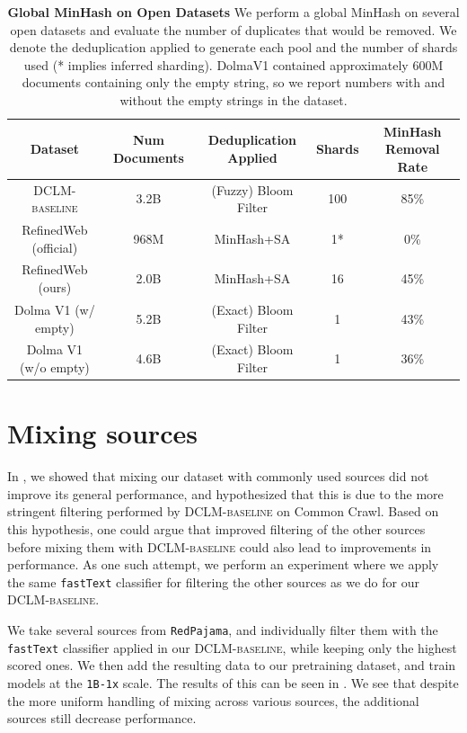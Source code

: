\documentclass{article}
\newcommand{\hqpool}{\textsc{DCLM-baseline}\xspace}
\newcommand{\strack}{\texttt{1B-1x}\xspace}
\newcommand{\rpj}{\texttt{RedPajama}\xspace}
\newcommand{\fasttext}{\texttt{fastText}\xspace}
\newcommand{\commoncrawl}{Common Crawl\xspace}
\begin{document}
\begin{table}[t]
\centering
\small
\caption{\textbf{Global MinHash on Open Datasets} We perform a global MinHash on several open datasets and evaluate the number of duplicates that would be removed. We denote the deduplication applied to generate each pool and the number of shards used (* implies inferred sharding). DolmaV1 contained approximately 600M documents containing only the empty string, so we report numbers with and without the empty strings in the dataset.}
\label{table:dedup-ablations-minhash}
\begin{tabular}{cccc|c}
\toprule
Dataset & Num Documents & Deduplication Applied & Shards & MinHash Removal Rate \\
\midrule
\hqpool & 3.2B & (Fuzzy) Bloom Filter & 100 & 85\% \\
RefinedWeb (official) & 968M & MinHash+SA & 1* & 0\% \\
RefinedWeb (ours) & 2.0B & MinHash+SA & 16 & 45\% \\
Dolma V1 (w/ empty) & 5.2B & (Exact) Bloom Filter & 1 & 43\% \\
Dolma V1 (w/o empty) & 4.6B & (Exact) Bloom Filter & 1 & 36\% \\
\bottomrule
\end{tabular}
\end{table}

\section{Mixing sources}\label{appx:mixing}

In , we showed that mixing our dataset with commonly used sources did not improve its general performance, and hypothesized that this is due to the more stringent filtering performed by \hqpool on \commoncrawl.
Based on this hypothesis, one could argue that improved filtering of the other sources before mixing them with \hqpool could also lead to improvements in performance.
As one such attempt, we perform an experiment where we apply the same \fasttext classifier for filtering
the other sources as we do for our \hqpool.

We take several sources from \rpj \citep{rpj}, and individually filter them with the \fasttext classifier applied in our \hqpool, while keeping only the highest scored ones.
We then add the resulting data to our pretraining dataset, and train models at the \strack scale.
The results of this can be seen in .
We see that despite the more uniform handling of mixing across various sources, the additional sources still decrease performance.
\end{document}
